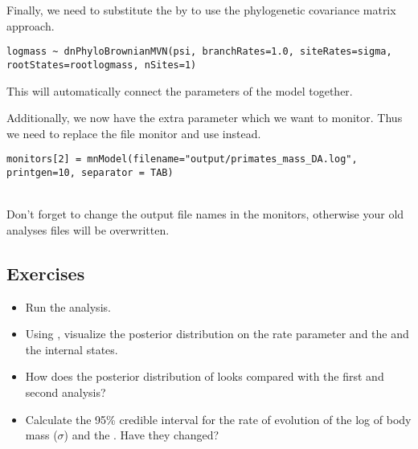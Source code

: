 Finally, we need to substitute the  by  to use the phylogenetic covariance matrix approach.
{\tt \small \begin{snugshade*}
\begin{lstlisting}
logmass ~ dnPhyloBrownianMVN(psi, branchRates=1.0, siteRates=sigma, rootStates=rootlogmass, nSites=1)
\end{lstlisting}
\end{snugshade*}}
This will automatically connect the parameters of the model together.

Additionally, we now have the extra parameter  which we want to monitor.
Thus we need to replace the file monitor and use instead.
{\tt \small \begin{snugshade*}
\begin{lstlisting}
monitors[2] = mnModel(filename="output/primates_mass_DA.log", printgen=10, separator = TAB)
\end{lstlisting}
\end{snugshade*}}


\noindent \\ \impmark Don't forget to change the output file names in the monitors, otherwise your old analyses files will be overwritten.


\subsection*{Exercises}

\begin{itemize}
\item
Run the analysis.
\item
Using , visualize the posterior distribution on the rate parameter  and the  and the internal states.
\item 
How does the posterior distribution of  looks compared with the first and second analysis?
\item
Calculate the 95\% credible interval for the rate of evolution of the log of body mass ($\sigma$) and the . Have they changed?
\end{itemize}

\vspace{5cm}







